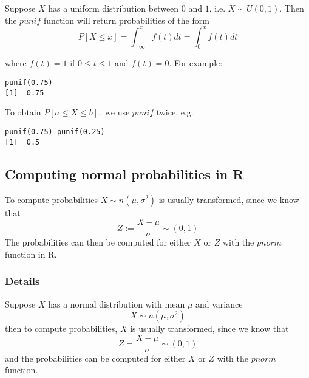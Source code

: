 \documentclass[12pt,a4paper]{article}
\theoremstyle{regla}
\theoremstyle{remark}
\theoremstyle{definition}
\theoremstyle{nonumberbreak}
\begin{document}
\begin{xmpl}

Suppose $X$ has a uniform distribution between $0$ and $1$, i.e. $X \sim U(0,1)$.  Then the $punif$ function will return probabilities of the form $$ P[X \leq x]= \int_{-\infty}^{x} f(t)dt= \int_{0}^{x} f(t)dt$$

where $f(t)=1$ if $0 \leq t \leq 1$
and $f(t)=0$.
For example:
\begin{lstlisting}
punif(0.75)
[1]  0.75
\end{lstlisting}

To obtain $P[a \leq X \leq b],$ we use $punif$ twice, e.g.
\begin{lstlisting}
punif(0.75)-punif(0.25)
[1]  0.5
\end{lstlisting}
\end{xmpl}


\subsection{Computing normal probabilities in R}
\begin{fbox}
\begin{minipage}{0.97\textwidth}
To compute probabilities $X\sim n(\mu,\sigma^2)$
is usually transformed, since we know that
$$
Z:=\frac{X-\mu}{\sigma} \sim(0,1)
$$
The probabilities can then be computed for either $X$ or $Z$ with the $pnorm$ function in R.
\end{minipage}
\end{fbox}
\subsubsection{Details}
Suppose $X$ has a normal distribution with mean $\mu$ and variance 
$$
X\sim n(\mu,\sigma^2)
$$
then to compute probabilities, $X$ is usually transformed, since we know that
$$
Z=\frac{X-\mu}{\sigma} \sim(0,1)
$$
and the probabilities can be computed for either $X$ or $Z$ with the $pnorm$ function.
\end{document}
